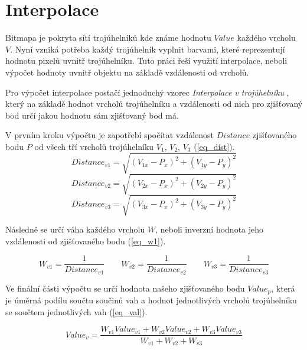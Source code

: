 \documentclass[czech,bachelor,dept460,male,csharp,cpdeclaration]{diploma}
\begin{document}
	\section{Interpolace}
	
	Bitmapa je pokryta sítí trojúhelníků kde známe hodnotu $Value$ každého vrcholu $V$. Nyní vzniká potřeba každý trojúhelník vyplnit barvami, které reprezentují hodnotu pixelů uvnitř trojúhelníku. Tuto práci řeší využití interpolace, neboli výpočet hodnoty uvnitř objektu na základě vzdálenosti od vrcholů.
	
	Pro výpočet interpolace postačí jednoduchý vzorec \emph{Interpolace v trojúhelníku} \cite{interp}, který na základě hodnot vrcholů trojúhelníku a vzdálenosti od nich pro zjišťovaný bod určí jakou hodnotu sám zjišťovaný bod má.
	
	
	V prvním kroku výpočtu je zapotřebí spočítat vzdálenost $Distance$ zjišťovaného bodu $P$ od všech tří vrcholů trojúhelníku $V_1$, $V_2$, $V_3$ (\ref{eq_dist}). 
	\newpage
	\begin{displaymath}
		Distance_{v1} =\sqrt{(V_{1x}-P_x)^2+(V_{1y}-P_y)^2}
	\end{displaymath}
	\begin{displaymath}
		Distance_{v2} =\sqrt{(V_{2x}-P_x)^2+(V_{2y}-P_y)^2}
	\end{displaymath}
	\begin{equation}\label{eq_dist}
		Distance_{v3} =\sqrt{(V_{3x}-P_x)^2+(V_{3y}-P_y)^2}
	\end{equation}
	
	Následně se určí váha každého vrcholu $W$, neboli inverzní hodnota jeho vzdálenosti od zjišťovaného bodu (\ref{eq_w1}).
	
	\begin{equation}\label{eq_w1}
		W_{v1} =\frac{1}{Distance_{v1}}
		\quad\mathrm{ }\quad 
		W_{v2} =\frac{1}{Distance_{v2}}
		\quad\mathrm{ }\quad 
		W_{v3} =\frac{1}{Distance_{v3}} 
	\end{equation}
	
	Ve finální části výpočtu se určí hodnota našeho zjišťovaného bodu $Value_p$, která je úměrná podílu součtu součinů vah a hodnot jednotlivých vrcholů trojúhelníku se součtem jednotlivých vah (\ref{eq_val}).
	
	\begin{equation}\label{eq_val}
		Value_v = \frac{W_{v1}Value_{v1} + W_{v2}Value_{v2} + W_{v3}Value_{v3}}{W_{v1} + W_{v2} + W_{v3}}
	\end{equation}
	
\end{document}
